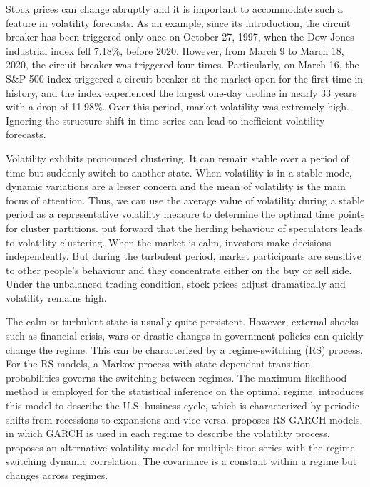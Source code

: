 \documentclass[preprint,12pt,authoryear]{elsarticle}
\begin{document}
Stock prices can change abruptly and it is important to accommodate such a feature in volatility forecasts. As an example, since its introduction, the circuit breaker has been triggered only once on October 27, 1997, when the Dow Jones industrial index fell 7.18\%, before 2020. However, from March 9 to March 18, 2020, the circuit breaker was triggered four times. Particularly, on March 16, the S\&P 500 index triggered a circuit breaker at the market open for the first time in history, and the index experienced the largest one-day decline in nearly 33 years with a drop of 11.98\%. Over this period, market volatility was extremely high. Ignoring the structure shift in time series can lead to inefficient volatility forecasts.

Volatility exhibits pronounced clustering. It can remain stable over a period of time but
suddenly switch to another state.
When volatility is in a stable mode, dynamic variations are a lesser concern and the mean of volatility is the main focus of attention.
Thus, we can use the average value of volatility during a stable
	period as a representative volatility measure to determine the optimal time points for cluster partitions.
\cite{Schmitt2017} put forward that the herding behaviour of speculators
	leads to volatility clustering. When the market is calm, investors make decisions
	independently. But during the turbulent period, market participants are sensitive to other people's behaviour and they concentrate either on the buy or sell side. Under the unbalanced trading condition, stock prices adjust dramatically and volatility remains high.
	
	The calm or turbulent state is usually quite persistent. However, external shocks	such as financial crisis, wars
	or drastic changes in government policies can quickly change the regime.
	This can be characterized by a regime-switching (RS) process.  For the RS models, a Markov process with
	state-dependent transition probabilities governs the switching between regimes. The maximum
	likelihood method is employed for the statistical inference on the optimal regime.
	\cite{Hamilton1989} introduces this model to describe the U.S. business cycle, which is characterized
	by periodic shifts from recessions to expansions and vice versa. \cite{Klaassen2002} proposes
	RS-GARCH models, in which GARCH is used in each regime to describe the volatility process.
	\cite{Pelletier2006} proposes an alternative volatility model for multiple time series with the regime switching
	dynamic correlation. The covariance is a constant within a regime but changes across regimes.
	
\end{document}
